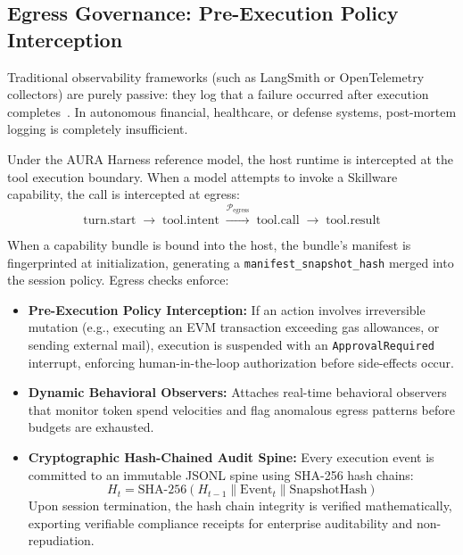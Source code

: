 \subsection{Egress Governance: Pre-Execution Policy Interception}
\label{subsec:aura_harness}

Traditional observability frameworks (such as LangSmith or OpenTelemetry collectors) are purely passive: they log that a failure occurred after execution completes~\cite{wang2024survey}. In autonomous financial, healthcare, or defense systems, post-mortem logging is completely insufficient.

Under the AURA Harness reference model, the host runtime is intercepted at the tool execution boundary. When a model attempts to invoke a Skillware capability, the call is intercepted at egress:
\begin{equation}
\label{eq:aura_lifecycle}
\text{turn.start} \;\longrightarrow\; \text{tool.intent} \;\xrightarrow{\mathcal{P}_{\text{egress}}}\; \text{tool.call} \;\longrightarrow\; \text{tool.result}
\end{equation}

When a capability bundle is bound into the host, the bundle's manifest is fingerprinted at initialization, generating a \texttt{manifest\_\allowbreak snapshot\_\allowbreak hash} merged into the session policy. Egress checks enforce:
\begin{itemize}[leftmargin=*]
  \item \textbf{Pre-Execution Policy Interception:} If an action involves irreversible mutation (e.g., executing an EVM transaction exceeding gas allowances, or sending external mail), execution is suspended with an \texttt{ApprovalRequired} interrupt, enforcing human-in-the-loop authorization before side-effects occur.
  \item \textbf{Dynamic Behavioral Observers:} Attaches real-time behavioral observers that monitor token spend velocities and flag anomalous egress patterns before budgets are exhausted.
  \item \textbf{Cryptographic Hash-Chained Audit Spine:} Every execution event is committed to an immutable JSONL spine using SHA-256 hash chains:
  \begin{equation}
  \label{eq:hash_chain}
  H_t = \text{SHA-256}\left( H_{t-1} \parallel \text{Event}_t \parallel \text{SnapshotHash} \right)
  \end{equation}
  Upon session termination, the hash chain integrity is verified mathematically, exporting verifiable compliance receipts for enterprise auditability and non-repudiation.
\end{itemize}

